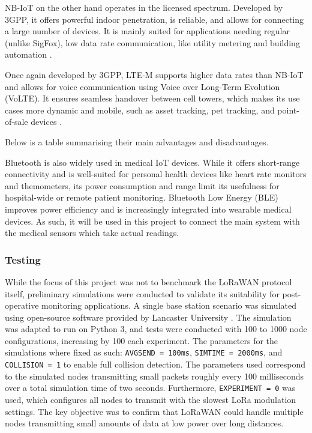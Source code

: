 NB-IoT on the other hand operates in the licensed spectrum. Developed by 3GPP, it offers powerful indoor penetration, is reliable, and allows for connecting a large number of devices. It is mainly suited for applications needing regular (unlike SigFox), low data rate communication, like utility metering and building automation \cite{nbiot_advantages_disadvantages}.

Once again developed by 3GPP, LTE-M supports higher data rates than NB-IoT and allows for voice communication using Voice over Long-Term Evolution (VoLTE). It ensures seamless handover between cell towers, which makes its use cases more dynamic and mobile, such as asset tracking, pet tracking, and point-of-sale devices \cite{ltem_telenor}.

Below is a table summarising their main advantages and disadvantages.



Bluetooth is also widely used in medical IoT devices. While it offers short-range connectivity and is well-suited for personal health devices like heart rate monitors and themometers, its power consumption and range limit its usefulness for hospital-wide or remote patient monitoring. Bluetooth Low Energy (BLE) improves power efficiency and is increasingly integrated into wearable medical devices. As such, it will be used in this project to connect the main system with the medical sensors which take actual readings.

\subsubsection{Testing}
While the focus of this project was not to benchmark the LoRaWAN protocol itself, preliminary simulations were conducted to validate its suitability for post-operative monitoring applications. A single base station scenario was simulated using open-source software provided by Lancaster University \cite{lancaster_uk_simulation_software}. The simulation was adapted to run on Python 3, and tests were conducted with 100 to 1000 node configurations, increasing by 100 each experiment. The parameters for the simulations where fixed as such: \texttt{AVGSEND = 100ms}, \texttt{SIMTIME = 2000ms}, and \texttt{COLLISION = 1} to enable full collision detection. The parameters used correspond to the simulated nodes transmitting small packets roughly every 100 milliseconds over a total simulation time of two seconds. Furthermore, \texttt{EXPERIMENT = 0} was used, which configures all nodes to transmit with the slowest LoRa modulation settings. The key objective was to confirm that LoRaWAN could handle multiple nodes transmitting small amounts of data at low power over long distances.

